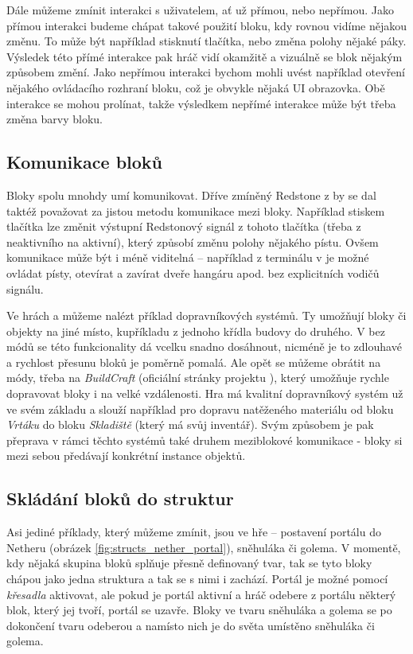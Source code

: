 Dále můžeme zmínit interakci s uživatelem, ať už přímou, nebo nepřímou. Jako přímou interakci budeme chápat takové použití bloku, kdy rovnou vidíme nějakou změnu. To může být například stisknutí tlačítka, nebo změna polohy nějaké páky. Výsledek této přímé interakce pak hráč vidí okamžitě a vizuálně se blok nějakým způsobem změní. Jako nepřímou interakci bychom mohli uvést například otevření nějakého ovládacího rozhraní bloku, což je obvykle nějaká UI obrazovka. Obě interakce se mohou prolínat, takže výsledkem nepřímé interakce může být třeba změna barvy bloku.


\subsection{Komunikace bloků}
Bloky spolu mnohdy umí komunikovat. Dříve zmíněný Redstone z  by se dal taktéž považovat za jistou metodu komunikace mezi bloky. Například stiskem tlačítka lze změnit výstupní Redstonový signál z tohoto tlačítka (třeba z neaktivního na aktivní), který způsobí změnu polohy nějakého pístu. Ovšem komunikace může být i méně viditelná -- například z terminálu v \SE{} je možné ovládat písty, otevírat a zavírat dveře hangáru apod. bez explicitních vodičů signálu.

Ve hrách \MC{} a \SE{} můžeme nalézt příklad dopravníkových systémů. Ty umožňují  bloky či objekty na jiné místo, kupříkladu z jednoho křídla budovy do druhého. V  bez módů se této funkcionality dá vcelku snadno dosáhnout, nicméně je to zdlouhavé a rychlost přesunu bloků je poměrně pomalá. Ale opět se můžeme obrátit na módy, třeba na \textit{BuildCraft} (oficiální stránky projektu \citep{buildcraft}), který umožňuje rychle dopravovat bloky i na velké vzdálenosti. Hra \SE{} má kvalitní dopravníkový systém už ve svém základu a slouží například pro dopravu natěženého materiálu od bloku \textit{Vrtáku} do bloku \textit{Skladiště} (který má svůj inventář). Svým způsobem je pak přeprava v rámci těchto systémů také druhem meziblokové komunikace - bloky si mezi sebou předávají konkrétní instance objektů.

\subsection{Skládání bloků do struktur}
Asi jediné příklady, který můžeme zmínit, jsou ve hře \MC{} -- postavení portálu do Netheru (obrázek \ref{fig:structs_nether_portal}), sněhuláka či golema. V momentě, kdy nějaká skupina bloků splňuje přesně definovaný tvar, tak se tyto bloky chápou jako jedna struktura a tak se s nimi i zachází. Portál je možné pomocí \textit{křesadla} aktivovat, ale pokud je portál aktivní a hráč odebere z portálu některý blok, který jej tvoří, portál se uzavře. Bloky ve tvaru sněhuláka a golema se po dokončení tvaru odeberou a namísto nich je do světa umístěno \NPC{} sněhuláka či golema.

